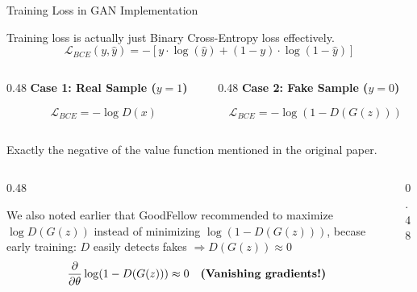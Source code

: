 \documentclass[aspectratio=169,xcolor=dvipsnames,svgnames,x11names,fleqn]{beamer}
\begin{document}
\begin{frame}{Training Loss in GAN Implementation}
\scriptsize

\begin{tcolorbox}[colback=blue!5, colframe=theoryblue, arc=2pt]
    Training loss is actually just Binary Cross-Entropy loss effectively.
    $$\mathcal{L}_{BCE}(y, \hat{y}) = -[y \cdot \log(\hat{y}) + (1-y) \cdot \log(1-\hat{y})]$$
\end{tcolorbox}

\begin{columns}[t]
    \begin{column}{0.48\textwidth}
        \textbf{Case 1: Real Sample ($y=1$)}
        \begin{tcolorbox}[colback=gray!5, colframe=gray!50, arc=0pt]
            $$\mathcal{L}_{BCE} = -\log D(x)$$
        \end{tcolorbox}
    \end{column}
    \begin{column}{0.48\textwidth}
        \textbf{Case 2: Fake Sample ($y=0$)}
        \begin{tcolorbox}[colback=gray!5, colframe=gray!50, arc=0pt]
            $$\mathcal{L}_{BCE} = -\log(1 - D(G(z)))$$
        \end{tcolorbox}
    \end{column}
\end{columns}

\vspace{0.2cm}
Exactly the negative of the value function mentioned in the original paper. 

\begin{columns}[t]
    \begin{column}{0.48\textwidth}
\begin{tcolorbox}[colback=red!5, colframe=warnred, arc=2pt]
    We also noted earlier that GoodFellow recommended to maximize $\log D(G(z))$ instead of minimizing $\log(1 - D(G(z)))$, becase early training: $D$ easily detects fakes $\Rightarrow D(G(z)) \approx 0$
    $$\frac{\partial}{\partial \theta} \log(1 - D(G(z))) \approx 0 \quad \text{\textbf{(Vanishing gradients!)}}$$
\end{tcolorbox}
    \end{column}
    \begin{column}{0.48\textwidth}
\begin{table}
\centering
{}
\end{table}


\end{column}
\end{columns}
\end{frame}
\end{document}
